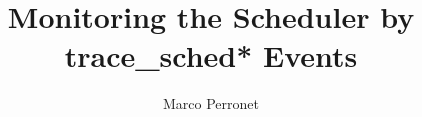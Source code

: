\documentclass[10pt, oneside]{book}
\author{Marco Perronet}
\title{Monitoring the Scheduler by trace\_sched* Events}
\begin{document}
\frontmatter

\begin{titlepage}
\maketitle  
\end{titlepage}

\tableofcontents


%

\mainmatter








% 
\end{document}
